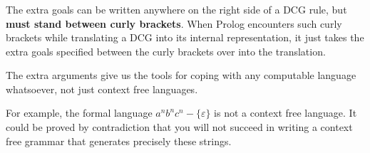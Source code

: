 

\begin{frame}
	\frametitle{\insertsection}
	
	The extra goals can be written anywhere on the right side of a DCG rule, but \textbf{must stand between curly brackets}. When Prolog encounters such curly brackets while translating a DCG into its internal representation, it just takes the extra goals specified between the curly brackets over into the translation.
	
	The extra arguments give us the tools for coping with any computable language whatsoever, not just context free languages.
	
	For example, the formal language \(a^nb^nc^n-\{\varepsilon \}\) is not a context free language. It could be proved by contradiction that you will not succeed in writing a context free grammar that generates precisely these strings.
		
\end{frame}


